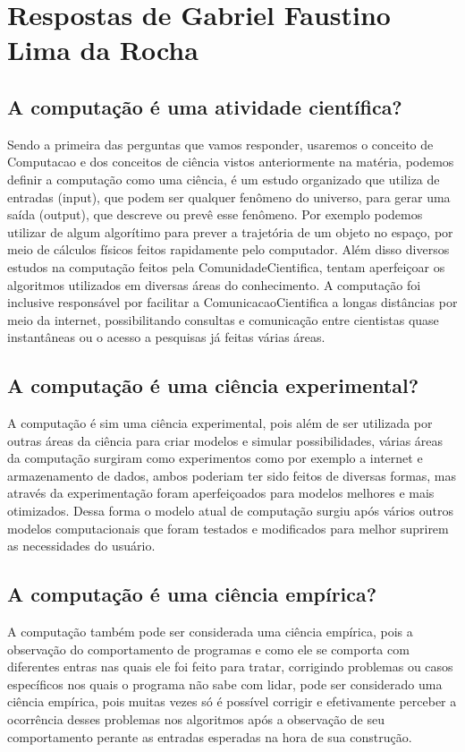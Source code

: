 \section{Respostas de Gabriel Faustino Lima da Rocha}

\subsection{A computação é uma atividade científica?}

Sendo a primeira das perguntas que vamos responder, usaremos o conceito de \gls{Computacao} e dos conceitos de ciência vistos anteriormente na matéria, podemos definir a computação como uma ciência, é um estudo organizado que utiliza de entradas (input), que podem ser qualquer fenômeno do universo, para gerar uma saída (output), que descreve ou prevê esse fenômeno. Por exemplo podemos utilizar de algum algorítimo para prever a trajetória de um objeto no espaço, por meio de cálculos físicos feitos rapidamente pelo computador. Além disso diversos estudos na computação feitos pela \gls{ComunidadeCientifica}, tentam aperfeiçoar os algoritmos utilizados em diversas áreas do conhecimento. A computação foi inclusive responsável por facilitar a \gls{ComunicacaoCientifica} a longas distâncias por meio da internet, possibilitando consultas e comunicação entre cientistas quase instantâneas ou o acesso a pesquisas já feitas várias áreas. 
\subsection{A computação é uma ciência experimental?}
A computação é sim uma ciência experimental, pois além de ser utilizada por outras áreas da ciência para criar modelos e simular possibilidades, várias áreas da computação surgiram como experimentos como por exemplo a internet e armazenamento de dados, ambos poderiam ter sido feitos de diversas formas, mas através da experimentação foram aperfeiçoados para modelos melhores e mais otimizados. Dessa forma o modelo atual de computação surgiu após vários outros modelos computacionais que foram testados e modificados para melhor suprirem as necessidades do usuário.

\subsection{A computação é uma ciência empírica?}
A computação também pode ser considerada uma ciência empírica, pois a observação do comportamento de programas e como ele se comporta com diferentes entras nas quais ele foi feito para tratar, corrigindo problemas ou casos específicos nos quais o programa não sabe com lidar, pode ser considerado uma ciência empírica, pois muitas vezes só é possível corrigir e efetivamente perceber a ocorrência desses problemas nos algoritmos após a observação de seu comportamento perante as entradas esperadas na hora de sua construção.